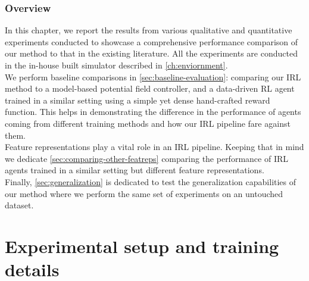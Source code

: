 \subsubsection*{Overview}
In this chapter, we report the results from various qualitative and quantitative experiments conducted to showcase a comprehensive performance comparison of our method to that in the existing literature. All the experiments are conducted in the in-house built simulator described in \autoref{ch:enviornment}. \\
We perform baseline comparisons in \autoref{sec:baseline-evaluation}: comparing our IRL method to a model-based potential field controller, and a data-driven RL agent trained in a similar setting using a simple yet dense hand-crafted reward function. This helps in demonstrating the difference in the performance of agents coming from different training methods and how our IRL pipeline fare against them.\\
 Feature representations play a vital role in an IRL pipeline. Keeping that in mind we dedicate \autoref{sec:comparing-other-featreps} comparing the performance of IRL agents trained in a similar setting but different feature representations.\\
 Finally, \autoref{sec:generalization} is dedicated to test the generalization capabilities of our method where we perform the same set of experiments on an untouched dataset.

%

\section{Experimental setup and training details}
\label{sec:exp-setup}

